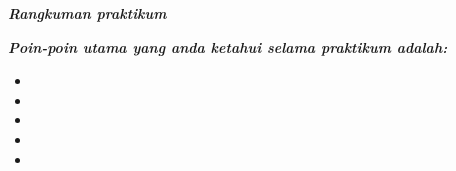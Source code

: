 \vspace*{-8.8mm}
{\centering\bfseries\fontsize{15}{18}\selectfont\judul\par}\vspace{1.4mm}
\begin{rangkuman}
  \linespread{1.0}\selectfont
  {\arialfont\bfseries\itshape\fontsize{12}{14}\selectfont Rangkuman praktikum}\par\vspace{4mm}
  {\arialfont\bfseries\itshape\fontsize{10}{12}\selectfont
   Poin-poin utama yang anda ketahui selama praktikum adalah:\par}\vspace{-1.5mm}
  \begin{itemize}[label=\raisebox{0.45ex}{\fontsize{3.2}{3.2}\selectfont$\blacksquare$},leftmargin=10.9mm,labelsep=3.85mm,labelwidth=0pt,
                  align=left,itemsep=0pt,topsep=0pt,parsep=0pt,
                  before=\normalfont\fontsize{9.6}{17.4}\selectfont]
    \item \titik
    \item \titik
    \item \titik
    \item \titik
    \item \titik
  \end{itemize}
\end{rangkuman}
